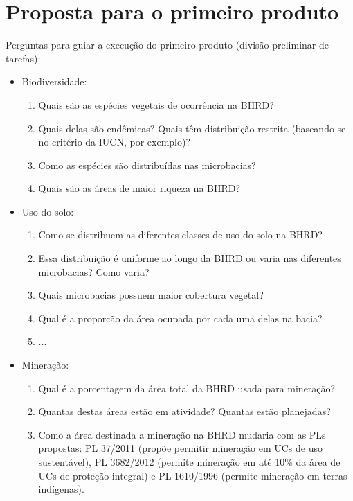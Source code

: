 \documentclass{article}
\begin{document}
\section{Proposta para o primeiro produto}

Perguntas para guiar a execução do primeiro produto (divisão preliminar de tarefas):

\begin{itemize}
    \item Biodiversidade:
    \begin{enumerate}
        \item Quais são as espécies vegetais de ocorrência na BHRD? 
        \item Quais delas são endêmicas? Quais têm distribuição restrita (baseando-se no critério da IUCN, por exemplo)?
        \item Como as espécies são distribuídas nas microbacias? 
        \item Quais são as áreas de maior riqueza na BHRD?
    \end{enumerate}
    
    \item Uso do solo:
    \begin{enumerate}
        \item Como se distribuem as diferentes classes de uso do solo na BHRD? 
        \item Essa distribuição é uniforme ao longo da BHRD ou varia nas diferentes microbacias? Como varia?
        \item Quais microbacias possuem maior cobertura vegetal?
        \item Qual é a proporcão da área ocupada por cada uma delas na bacia?
        \item ...
    \end{enumerate}
    
    \item Mineração:
    \begin{enumerate}
        \item Qual é a porcentagem da área total da BHRD usada para mineração?
        \item Quantas destas áreas estão em atividade? Quantas estão planejadas?
        \item Como a área destinada a mineração na BHRD mudaria com as PLs propostas: PL 37/2011 (propõe permitir mineração em UCs de uso sustentável), PL 3682/2012 (permite mineração em até 10\% da área de UCs de proteção integral) e PL 1610/1996 (permite mineração em terras indígenas).
    \end{enumerate}
    

\end{itemize}
\end{document}
